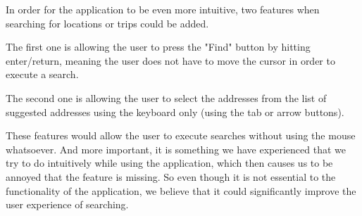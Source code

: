 In order for the application to be even more intuitive, two features when searching for locations or trips could be added.

The first one is allowing the user to press the "Find" button by hitting enter/return, meaning the user does not have to move the cursor in order to execute a search.

The second one is allowing the user to select the addresses from the list of suggested addresses using the keyboard only (using the tab or arrow buttons).

These features would allow the user to execute searches without using the mouse whatsoever. And more important, it is something we have experienced that we try to do intuitively while using the application, which then causes us to be annoyed that the feature is missing. So even though it is not essential to the functionality of the application, we believe that it could significantly improve the user experience of searching.